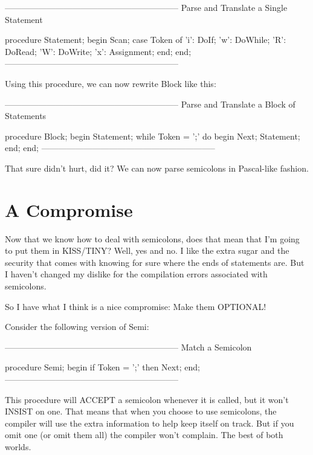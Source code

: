 \documentclass[float=false, crop=false]{standalone}
\begin{document}
\begin{code}
{--------------------------------------------------------------}
{ Parse and Translate a Single Statement }

procedure Statement;
begin
   Scan;
   case Token of
    'i': DoIf;
    'w': DoWhile;
    'R': DoRead;
    'W': DoWrite;
    'x': Assignment;
   end;
end;
{--------------------------------------------------------------}
\end{code}

Using this procedure, we can now rewrite Block like this:

\begin{code}
{--------------------------------------------------------------}
{ Parse and Translate a Block of Statements }

procedure Block;
begin
   Statement;
   while Token = ';' do begin
      Next;
      Statement;
   end;
end;
{--------------------------------------------------------------}
\end{code}

That sure didn't hurt, did it? We can now parse semicolons in Pascal-like
fashion.


\section{A Compromise}

Now that we know how to deal with semicolons, does that mean that I'm going to
put them in KISS/TINY? Well, yes and no. I like the extra sugar and the security
that comes with knowing for sure where the ends of statements are. But I haven't
changed my dislike for the compilation errors associated with semicolons.

So I have what I think is a nice compromise: Make them OPTIONAL!

Consider the following version of Semi:

\begin{code}
{--------------------------------------------------------------}
{ Match a Semicolon }

procedure Semi;
begin
   if Token = ';' then Next;
end;
{--------------------------------------------------------------}
\end{code}

This procedure will ACCEPT a semicolon whenever it is called, but it won't
INSIST on one. That means that when you choose to use semicolons, the compiler
will use the extra information to help keep itself on track. But if you omit one
(or omit them all) the compiler won't complain. The best of both worlds.
\end{document}

